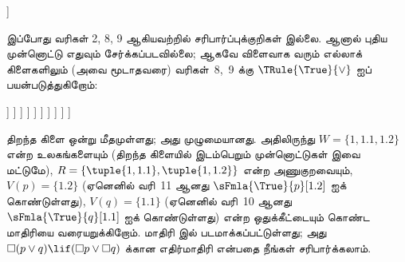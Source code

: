 \documentclass[../../../include/open-logic-section]{subfiles}
\begin{document}
{\begin{ex}
\begin{oltableau}
    ]
  \end{oltableau}
  இப்போது வரிகள் 2, 8, 9 ஆகியவற்றில் சரிபார்ப்புக்குறிகள் இல்லை.
  ஆனால் புதிய முன்னொட்டு எதுவும் சேர்க்கப்படவில்லை; ஆகவே விளைவாக வரும் எல்லாக்
  கிளைகளிலும் (அவை மூடாதவரை) வரிகள்~8,~9 க்கு
  $\TRule{\True}{\lor}$ ஐப் பயன்படுத்துகிறோம்:
  \begin{oltableau}
    [\pFmla{\False}{\Box(p \lor q) \lif (\Box p \lor \Box q)}{1},
      just = \TAss, checked
      [\pFmla{\True}{\Box(p \lor q)}{1},
        just = {\TRule{\False}{\lif}[1]}, checked
        [\pFmla{\False}{\Box p \lor \Box q}{1},
          just = {\TRule{\False}{\lif}[1]}, checked
          [\pFmla{\False}{\Box p}{1},
            just = {\TRule{\False}{\lor}[3]}, checked
            [\pFmla{\False}{\Box q}{1},
              just = {\TRule{\False}{\lor}[3]}, checked
              [\pFmla{\False}{p}{1.1},
                just = {\TRule{\False}{\Box}[4]}, checked
                [\pFmla{\False}{q}{1.2},
                  just = {\TRule{\False}{\Box}[5]}, checked
                  [\pFmla{\True}{p \lor q}{1.1},
                    just = {\TRule{\True}{\Box}[2]}, checked
                    [\pFmla{\True}{p \lor q}{1.2},
                      just = {\TRule{\True}{\Box}[2]}, checked
                      [\pFmla{\True}{p}{1.1},
                        just = {\TRule{\True}{\lor}[8]}, checked, close
                      ]
                      [\pFmla{\True}{q}{1.1},
                        just = {\TRule{\True}{\lor}[8]}, checked
                        [\pFmla{\True}{p}{1.2},
                          just = {\TRule{\True}{\lor}[9]}, checked]
                        [\pFmla{\True}{q}{1.2},
                          just = {\TRule{\True}{\lor}[9]}, checked, close]
                      ]
                    ]
                  ]
                ]
              ]
            ]
          ]
        ]
      ]
    ]
  \end{oltableau}
  திறந்த கிளை ஒன்று மீதமுள்ளது; அது முழுமையானது. அதிலிருந்து
  $W = \{1, 1.1, 1.2\}$ என்ற உலகங்களையும் (திறந்த கிளையில் இடம்பெறும்
  முன்னொட்டுகள் இவை மட்டுமே), $R = \{\tuple{1, 1.1}, \tuple{1, 1.2}\}$
  என்ற அணுகுறவையும், $V(p) = \{1.2\}$ (ஏனெனில் வரி~11 ஆனது
  $\sFmla{\True}{p}[1.2]$ ஐக் கொண்டுள்ளது), $V(q) = \{1.1\}$ (ஏனெனில்
  வரி~10 ஆனது $\sFmla{\True}{q}[1.1]$ ஐக் கொண்டுள்ளது) என்ற
  ஒதுக்கீட்டையும் கொண்ட மாதிரியை வரையறுக்கிறோம். மாதிரி
   இல் படமாக்கப்பட்டுள்ளது; அது $\Box(p \lor q)
  \lif (\Box p \lor \Box q)$ க்கான எதிர்மாதிரி என்பதை நீங்கள்
  சரிபார்க்கலாம்.
  \begin{figure}

\end{figure}
\end{ex}}
\end{document}
